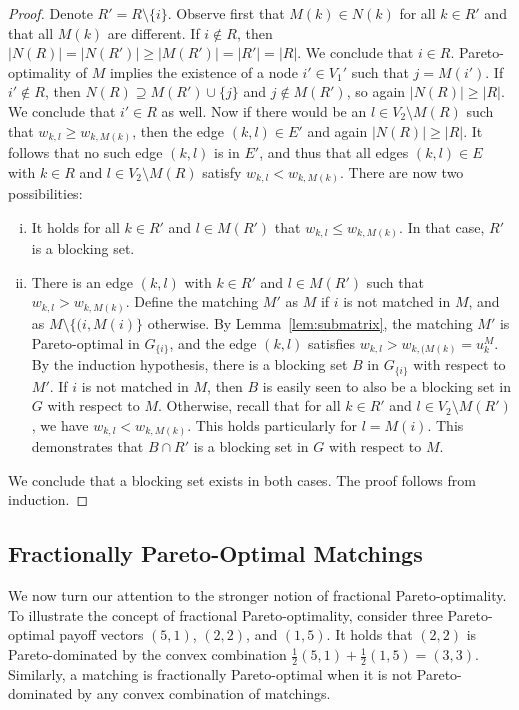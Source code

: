 \documentclass[a4paper, 11pt]{article}
\begin{document}
\begin{proof}
Denote $R'=R\setminus\{i\}$. Observe first that $M(k)\in N(k)$ for all $k\in R'$ and that all $M(k)$ are different. If $i\notin R$, then $|N(R)|=|N(R')|\geq |M(R')|=|R'|=|R|$. We conclude that $i\in R$. Pareto-optimality of $M$ implies the existence of a node $i'\in V_1'$ such that $j=M(i')$. If $i'\notin R$, then $N(R)\supseteq M(R')\cup\{j\}$ and $j\notin M(R')$, so again $|N(R)|\geq |R|$. We conclude that $i'\in R$ as well. Now if there would be an $l\in V_2\setminus M(R)$ such that $w_{k,l} \geq w_{k,M(k)}$, then the edge $(k,l)\in E'$ and again $|N(R)|\geq |R|$. It follows that no such edge $(k,l)$ is in $E'$, and thus that all edges $(k,l)\in E$ with $k\in R$ and $l\in V_2\setminus M(R)$ satisfy $w_{k,l}<w_{k,M(k)}$. There are now two possibilities:
\begin{enumerate}[(i)]
        \item  It holds for all $k\in R'$ and $l\in M(R')$ that $w_{k,l}\leq w_{k,M(k)}$. In that case, $R'$ is a blocking set.
        \item There is an edge $(k,l)$ with $k\in R'$ and $l\in M(R')$ such that $w_{k,l} > w_{k,M(k)}$. Define the matching $M'$ as $M$ if $i$ is not matched in $M$, and as $M\setminus \{(i,M(i)\}$ otherwise. By Lemma~\ref{lem:submatrix}, the matching $M'$ is Pareto-optimal in $G_{\{i\}}$, and the edge $(k,l)$ satisfies $w_{k,l} > w_{k,(M(k)} = u_k^M$. By the induction hypothesis, there is a blocking set $B$ in $G_{\{i\}}$ with respect to $M'$. If $i$ is not matched in $M$, then $B$ is easily seen to also be a blocking set in $G$ with respect to $M$. Otherwise, recall that for all $k\in R'$ and $l\in V_2\setminus M(R')$, we have $w_{k,l}<w_{k,M(k)}$. This holds particularly for $l=M(i)$. This demonstrates that $B\cap R'$ is a blocking set in $G$ with respect to $M$.
\end{enumerate}
We conclude that a blocking set exists in both cases. The proof follows from induction.
\end{proof}



\subsection{Fractionally Pareto-Optimal Matchings}
\label{subsec:matchings_fpo}

We now turn our attention to the stronger notion of fractional Pareto-optimality. To illustrate the concept of fractional Pareto-optimality, consider three Pareto-optimal payoff vectors $(5,1)$, $(2,2)$, and $(1,5)$. It holds that $(2,2)$ is Pareto-dominated by the convex combination $\frac12(5,1)+\frac12(1,5)=(3,3)$. Similarly, a matching is fractionally Pareto-optimal when it is not Pareto-dominated by any convex combination of matchings.
\end{document}
